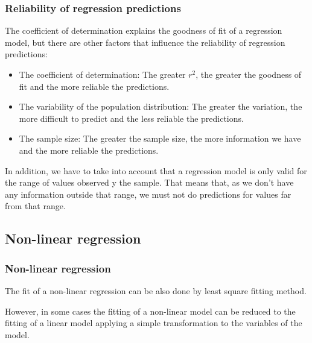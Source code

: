 \begin{frame}
\frametitle{Reliability of regression predictions}
The coefficient of determination explains the goodness of fit of a regression model, but there are other factors that
influence the reliability of regression predictions:

\begin{itemize}
\item The coefficient of determination: The greater $r^2$, the greater the goodness of fit and the more reliable the predictions.
\item The variability of the population distribution: The greater the variation, the more difficult to predict and the
less reliable the predictions.
\item The sample size: The greater the sample size, the more information we have and the more reliable the
predictions. 
\end{itemize}

In addition, we have to take into account that a regression model is only valid for the range of values observed y the
sample. 
That means that, as we don't have any information outside that range, we must not do predictions for values far from
that range.
\end{frame}


\subsection{Non-linear regression}
\begin{frame}
\frametitle{Non-linear regression}
The fit of a non-linear regression can be also done by least square fitting method.

However, in some cases the fitting of a non-linear model can be reduced to the fitting of a linear model applying a
simple transformation to the variables of the model. 
\end{frame}


